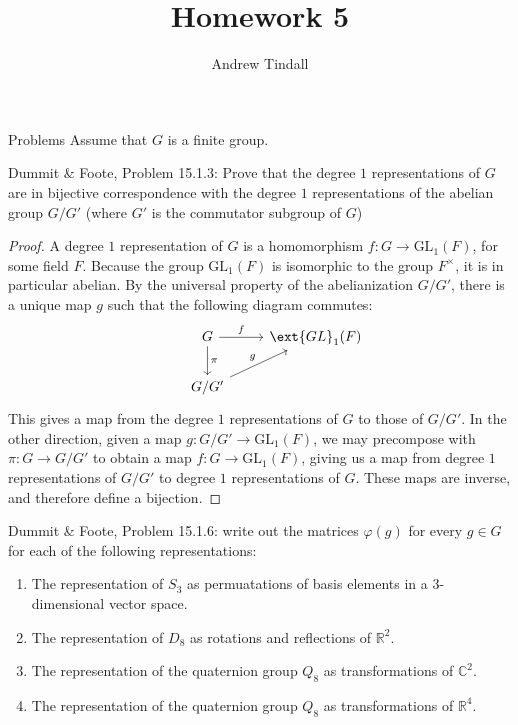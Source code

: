 \documentclass[12pt]{article}
\newcommand{\R}{\mathbb{R}}
\theoremstyle{definition}
\newenvironment{problem}[2][Problem]{\begin{trivlist}
\item[\hskip \labelsep {\bfseries #1}\hskip \labelsep {\bfseries #2.}]}{\end{trivlist}}
\begin{document}
 
 
\title{Homework 5}
\author{Andrew Tindall}
 
\maketitle
\begin{section}{Problems}
	Assume that $G$ is a finite group.
	\begin{problem}{1}
	Dummit \& Foote, Problem 15.1.3: Prove that the degree $1$ representations of $G$ are in bijective correspondence with the degree $1$ representations of the abelian group $G/G'$ (where $G'$ is the commutator subgroup of $G$)
\end{problem}
\begin{proof}
	A degree $1$ representation of $G$ is a homomorphism $f : G \to \text{GL}_1(F)$, for some field $F$. Because the group $\text{GL}_1(F)$ is isomorphic to the group $F^\times$, it is in particular abelian. By the universal property of the abelianization $G/G'$, there is a unique map $g$ such that the following diagram commutes:
	\[\begin{tikzcd}&G \arrow[r, "f"] \arrow[d, "\pi"] &\ext{GL}_1(F) \\&G/G' \arrow[ur, "g"] \end{tikzcd}\]
	This gives a map from the degree $1$ representations of $G$ to those of $G/G'$. In the other direction, given a map $g : G/G' \to \text{GL}_1(F)$, we may precompose with $\pi: G \to G/G'$ to obtain a map $f: G \to \text{GL}_1(F)$, giving us a map from degree $1$ representations of $G/G'$ to degree $1$ representations of $G$. These maps are inverse, and therefore define a bijection.
\end{proof}
\begin{problem}{2}
	Dummit \& Foote, Problem 15.1.6: write out the matrices $\varphi(g)$ for every $g \in G$ for each of the following representations:
	\begin{enumerate}[label=(\alph*)]
		\item The representation of $S_3$ as permuatations of basis elements in a $3$-dimensional vector space.
		\item The representation of $D_8$ as rotations and reflections of $\R^2$.
		\item The representation of the quaternion group $Q_8$ as transformations of $\mathbb C^2$.
		\item The representation of the quaternion group $Q_8$ as transformations of $\R^4$.

\end{enumerate}
\end{problem}
\end{section}
\end{document}
